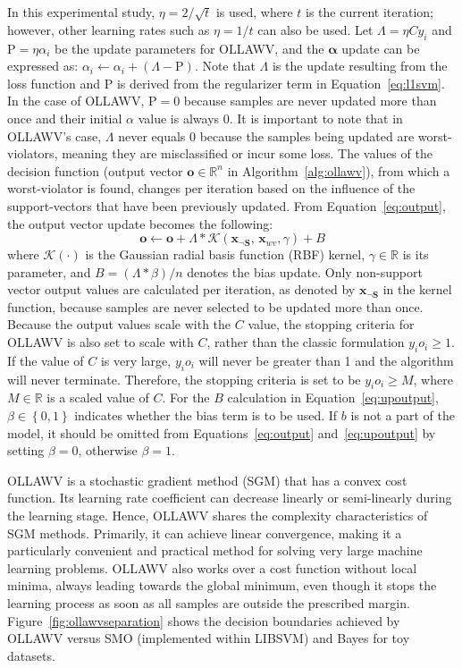 \documentclass[reqno]{vcuthesis}
\newcommand{\set}[1]{{\left\{#1\right\}}}
\newcommand{\reals}{{\mathbb{R}}}
\newcommand{\Rho}{\mathrm{P}}
\numberwithin{equation}{chapter}
\begin{document}
In this experimental study, $\eta = 2/\sqrt{t}$ is used, where $t$ is the current iteration; however, other learning rates such as $\eta = 1/t$ can also be used. Let $\Lambda = \eta Cy_i$ and $\Rho = \eta \alpha_i$ be the update parameters for OLLAWV, and the $\bm \alpha$ update can be expressed as: $\alpha_i \leftarrow \alpha_i + (\Lambda - \Rho)$. Note that $\Lambda$ is the update resulting from the loss function and $\Rho$ is derived from the regularizer term in Equation~\ref{eq:l1svm}. In the case of OLLAWV, $\Rho = 0$ because samples are never updated more than once and their initial $\alpha$ value is always $0$. It is important to note that in OLLAWV's case, $\Lambda$ never equals $0$ because the samples being updated are worst-violators, meaning they are misclassified or incur some loss. The values of the decision function (output vector $\bm o \in \reals^n$ in Algorithm~\ref{alg:ollawv}), from which a worst-violator is found, changes per iteration based on the influence of the support-vectors that have been previously updated. From Equation~\ref{eq:output}, the output vector update becomes the following: 
\begin{equation}
\label{eq:upoutput}
\bm o \leftarrow \bm o + \Lambda*\mathcal{K}\left(\bm{x}_{\neg \bm S},\, \bm{x}_{wv}, \gamma \right) + B
\end{equation}
where $\mathcal{K}(\cdot)$ is the Gaussian radial basis function (RBF) kernel, $\gamma \in \reals$ is its parameter, and $B = (\Lambda * \beta)/n$ denotes the bias update. Only non-support vector output values are calculated per iteration, as denoted by $\bm x_{\neg \bm S}$ in the kernel function, because samples are never selected to be updated more than once. Because the output values scale with the $C$ value, the stopping criteria for OLLAWV is also set to scale with $C$, rather than the classic formulation $y_i o_i \geq 1$. If the value of $C$ is very large, $y_i o_i$ will never be greater than 1 and the algorithm will never terminate. Therefore, the stopping criteria is set to be $y_i o_i \geq M$, where $M \in \reals$ is a scaled value of $C$. For the $B$ calculation in Equation~\ref{eq:upoutput}, $\beta \in \set{0,1}$ indicates whether the bias term is to be used. If $b$ is not a part of the model, it should be omitted from Equations~\ref{eq:output} and~\ref{eq:upoutput} by setting $\beta = 0$, otherwise $\beta = 1$. 

OLLAWV is a stochastic gradient method (SGM) that has a convex cost function. Its learning rate coefficient can decrease linearly or semi-linearly during the learning stage. Hence, OLLAWV shares the complexity characteristics of SGM methods. Primarily, it can achieve linear convergence, making it a particularly convenient and practical method for solving very large machine learning problems. OLLAWV also works over a cost function without local minima, always leading towards the global minimum, even though it stops the learning process as soon as all samples are outside the prescribed margin. Figure~\ref{fig:ollawvseparation} shows the decision boundaries achieved by OLLAWV versus SMO (implemented within LIBSVM) and Bayes for toy datasets. 
\end{document}

